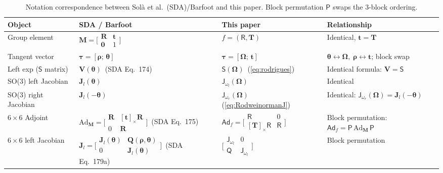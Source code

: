 \documentclass[journal]{IEEEtran}
\newcommand{\bfOmega}{\boldsymbol{\Omega}}
\newcommand{\bftau}{\boldsymbol{\tau}}
\newcommand{\bfrho}{\boldsymbol{\rho}}
\newcommand{\bftheta}{\boldsymbol{\theta}}
\begin{document}
\begin{table}[t]
\centering
\caption{Notation correspondence between Sol\`{a} et al.\ (SDA)/Barfoot
and this paper. Block permutation $\mathsf{P}$ swaps the 3-block ordering.}
\label{tab:notation}
\renewcommand{\arraystretch}{1.35}
\begin{tabular}{lllp{5.0cm}}
\hline
\textbf{Object} & \textbf{SDA / Barfoot} & \textbf{This paper} & \textbf{Relationship} \\
\hline
Group element & $\mathbf{M} = \bigl[\begin{smallmatrix} \mathbf{R} & \mathbf{t} \\ \mathbf{0} & 1 \end{smallmatrix}\bigr]$ & $f = (\mathsf{R}, \mathbf{T})$ & Identical, $\mathbf{t} = \mathbf{T}$ \\[3pt]
Tangent vector & $\bftau = [\bfrho;\, \bftheta]$ & $\bftau = [\bfOmega;\, \mathbf{t}]$ & $\bftheta \leftrightarrow \bfOmega,\; \bfrho \leftrightarrow \mathbf{t}$; block swap \\[3pt]
Left exp ($\mathsf{S}$ matrix) & $\mathbf{V}(\bftheta)$\, (SDA Eq.~174) & $\mathsf{S}(\bfOmega)$\, (\ref{eq:rodrigues}) & Identical formula: $\mathbf{V} = \mathsf{S}$ \\[3pt]
SO(3) left Jacobian & $\mathbf{J}_l(\bftheta)$ & $\mathsf{J}_{\omega_l}(\bfOmega)$ & Identical \\[3pt]
SO(3) right Jacobian & $\mathbf{J}_l(-\bftheta)$ & $\mathsf{J}_{\omega_r}(\bfOmega)$\, (\ref{eq:RodweinormanJ}) & Identical: $\mathsf{J}_{\omega_r}(\bfOmega) = \mathbf{J}_l(-\bftheta)$ \\[3pt]
$6\times 6$ Adjoint & $\text{Ad}_\mathbf{M} = \bigl[\begin{smallmatrix} \mathbf{R} & [\mathbf{t}]_\times\mathbf{R} \\ 0 & \mathbf{R} \end{smallmatrix}\bigr]$\, (SDA Eq.~175) & $\mathsf{Ad}_f = \bigl[\begin{smallmatrix} \mathsf{R} & 0 \\ [\mathbf{T}]_\times\mathsf{R} & \mathsf{R} \end{smallmatrix}\bigr]$ & Block permutation: $\mathsf{Ad}_f = \mathsf{P}\,\text{Ad}_\mathbf{M}\,\mathsf{P}$ \\[3pt]
$6\times 6$ left Jacobian &  $\mathbf{J}_l = \bigl[\begin{smallmatrix} \mathbf{J}_l(\bftheta) & \mathbf{Q}(\bfrho,\bftheta) \\ 0 & \mathbf{J}_l(\bftheta) \end{smallmatrix}\bigr]$\, (SDA Eq.~179a) & $\bigl[\begin{smallmatrix} \mathsf{J}_{\omega_l} & 0 \\ \mathsf{Q} & \mathsf{J}_{\omega_l} \end{smallmatrix}\bigr]$ & Block permutation \\[3pt]

\end{tabular}
\end{table}
\end{document}
